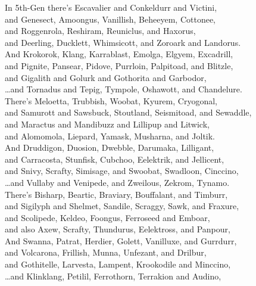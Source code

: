 \documentclass{amsart}
\begin{document}
In 5th-Gen there's Escavalier and Conkeldurr and Victini,\\
and Genesect, Amoongus, Vanillish, Beheeyem, Cottonee,\\
and Roggenrola, Reshiram, Reuniclus, and Haxorus,\\
and Deerling, Ducklett, Whimsicott, and Zoroark and Landorus.\\

And Krokorok, Klang, Karrablast, Emolga, Elgyem, Excadrill,\\
and Pignite, Pansear, Pidove, Purrloin, Palpitoad, and Blitzle,\\
and Gigalith and Golurk and Gothorita and Garbodor,\\
\dots and Tornadus and Tepig, Tympole, Oshawott, and Chandelure.\\

There's Meloetta, Trubbish, Woobat, Kyurem, Cryogonal,\\
and Samurott and Sawsbuck, Stoutland, Seismitoad, and Sewaddle,\\
and Maractus and Mandibuzz and Lillipup and Litwick,\\
and Alomomola, Liepard, Yamask, Musharna, and Joltik.\\

And Druddigon, Duosion, Dwebble, Darumaka, Lilligant,\\
and Carracosta, Stunfisk, Cubchoo, Eelektrik, and Jellicent,\\
and Snivy, Scrafty, Simisage, and Swoobat, Swadloon, Cinccino,\\
\dots and Vullaby and Venipede, and Zweilous, Zekrom, Tynamo.\\

There's Bisharp, Beartic, Braviary, Bouffalant, and Timburr,\\
and Sigilyph and Shelmet, Sandile, Scraggy, Sawk, and Fraxure,\\
and Scolipede, Keldeo, Foongus, Ferroseed and Emboar,\\
and also Axew, Scrafty, Thundurus, Eelektross, and Panpour,\\

And Swanna, Patrat, Herdier, Golett, Vanilluxe, and Gurrdurr,\\
and Volcarona, Frillish, Munna, Unfezant, and Drilbur,\\
and Gothitelle, Larvesta, Lampent, Krookodile and Minccino,\\
\dots and Klinklang, Petilil, Ferrothorn, Terrakion and Audino,\\
\end{document}
